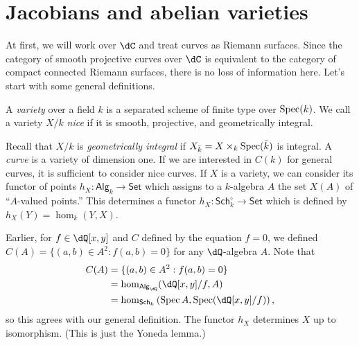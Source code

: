






\section{Jacobians and abelian varieties}


At first, we will work over $\dC$ and treat curves as Riemann surfaces. Since 
the category of smooth projective curves over $\dC$ is equivalent to the 
category of compact connected Riemann surfaces, there is no loss of 
information here. Let's start with some general definitions.

\begin{definition}
A \emph{variety} over a field $k$ is a separated scheme of finite type over 
$\operatorname{Spec}(k)$. We call a variety $X/k$ \emph{nice} if it is smooth, projective, 
and geometrically integral.
\end{definition}

Recall that $X/k$ is \emph{geometrically integral} if 
$X_{\bar k}=X\times_k \operatorname{Spec}(\bar k)$ is integral. A \emph{curve} is a 
variety of dimension one. If we are interested in $C(k)$ for general curves, 
it is sufficient to consider nice curves. If $X$ is a variety, we can consider 
its functor of points $h_X:\mathsf{Alg}_k\to \mathsf{Set}$ which assigns to a 
$k$-algebra $A$ the set $X(A)$ of ``$A$-valued points.'' This determines a 
functor $h_X:\mathsf{Sch}_k^\circ\to\mathsf{Set}$ which is defined by 
$h_X(Y)=\hom_k(Y,X)$. 

Earlier, for $f\in \dQ[x,y]$ and $C$ defined by the equation $f=0$, we 
defined $C(A)=\{(a,b)\in A^2:f(a,b)=0\}$ for any $\dQ$-algebra $A$. 
Note that 
\begin{align*}
  C(A) &= \{(a,b)\in A^2:f(a,b) = 0\} \\
    &= \hom_{\mathsf{Alg}_\dQ}(\dQ[x,y]/f,A) \\
    &= \hom_{\mathsf{Sch}_k}\left(\spec A,\spec(\dQ[x,y]/f)\right) \text{,}
\end{align*}
so this agrees with our general definition. The functor $h_X$ determines $X$ 
up to isomorphism. (This is just the Yoneda lemma.)






